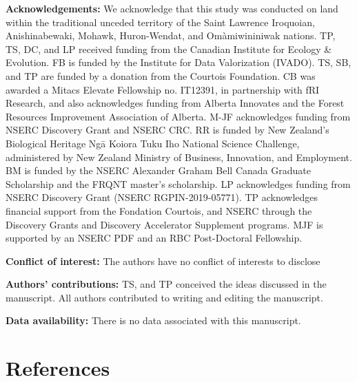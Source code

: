 \documentclass[
  letterpaper,
  DIV=11,
  numbers=noendperiod]{scrartcl}
\begin{document}
\textbf{Acknowledgements:} We acknowledge that this study was conducted
on land within the traditional unceded territory of the Saint Lawrence
Iroquoian, Anishinabewaki, Mohawk, Huron-Wendat, and Omàmiwininiwak
nations. TP, TS, DC, and LP received funding from the Canadian Institute
for Ecology \& Evolution. FB is funded by the Institute for Data
Valorization (IVADO). TS, SB, and TP are funded by a donation from the
Courtois Foundation. CB was awarded a Mitacs Elevate Fellowship no.
IT12391, in partnership with fRI Research, and also acknowledges funding
from Alberta Innovates and the Forest Resources Improvement Association
of Alberta. M-JF acknowledges funding from NSERC Discovery Grant and
NSERC CRC. RR is funded by New Zealand's Biological Heritage Ngā Koiora
Tuku Iho National Science Challenge, administered by New Zealand
Ministry of Business, Innovation, and Employment. BM is funded by the
NSERC Alexander Graham Bell Canada Graduate Scholarship and the FRQNT
master's scholarship. LP acknowledges funding from NSERC Discovery Grant
(NSERC RGPIN-2019-05771). TP acknowledges financial support from the
Fondation Courtois, and NSERC through the Discovery Grants and Discovery
Accelerator Supplement programs. MJF is supported by an NSERC PDF and an
RBC Post-Doctoral Fellowship.

\textbf{Conflict of interest:} The authors have no conflict of interests
to disclose

\textbf{Authors' contributions:} TS, and TP conceived the ideas
discussed in the manuscript. All authors contributed to writing and
editing the manuscript.

\textbf{Data availability:} There is no data associated with this
manuscript.

\hypertarget{references}{%
\section*{References}\label{references}}
\end{document}
